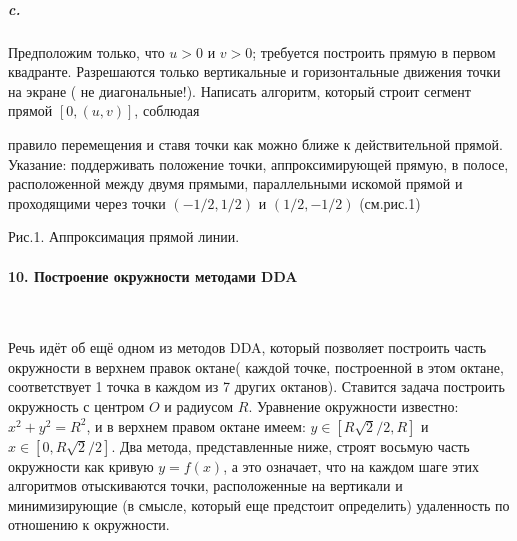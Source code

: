 \documentclass{mai_book}
\begin{document}
\subparagraph { c.} Предположим только, что $u>0$ и $v>0$; требуется построить прямую в первом квадранте. Разрешаются только вертикальные и горизонтальные движения точки на экране ( не диагональные!). Написать алгоритм, который строит сегмент прямой $\left[{0,\left({u,v}\right)}\right]$, соблюдая 

\newpage

правило перемещения и ставя точки как можно ближе к действительной прямой. Указание: поддерживать положение точки, аппроксимирующей прямую, в полосе, расположенной между двумя прямыми, параллельными искомой прямой и проходящими через точки $\left({-1/2,1/2}\right)$ и $\left({1/2,-1/2}\right)$ (см.рис.1) 

\begin{center}
\end{center}
\begin{center}
Рис.1. Аппроксимация прямой линии. 
\end{center}

\paragraph { 10. Построение окружности методами DDA}\ \newline

Речь идёт об ещё одном из методов DDA, который позволяет построить часть окружности в верхнем правок октане( каждой точке, построенной в этом октане, соответствует 1 точка в каждом из 7 других октанов). Ставится задача построить окружность с центром $O$ и радиусом $R$. Уравнение окружности известно: $x^{2}+y^{2}=R^{2}$, и в верхнем правом октане имеем: $y\in{\left[{R\sqrt{2}/2,R}\right]}$ и $ x\in{\left[{0,R\sqrt{2}/2}\right]}$. Два метода, представленные ниже, строят восьмую часть окружности как кривую $y=f\left({x}\right)$, а это означает, что на каждом шаге этих алгоритмов отыскиваются точки, расположенные на вертикали и минимизирующие (в смысле, который еще предстоит определить) удаленность по отношению к окружности. 
\end{document}
